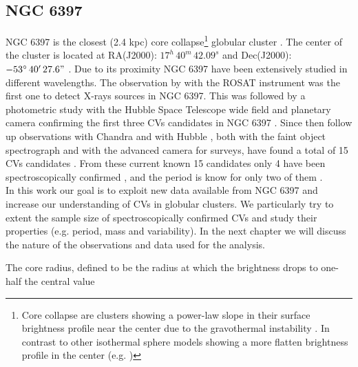 \subsection{NGC 6397}
NGC 6397 is the closest (2.4 kpc) core collapse\footnote{Core collapse are clusters showing a power-law slope in their surface brightness profile near the center due to the gravothermal instability \citep{antonov_solution_1962,lynden-bell_gravo-thermal_1968,lynden-bell_consequences_1980}. In contrast to other isothermal sphere models showing a more flatten brightness profile in the center (e.g. \cite{king_structure_1966})} globular cluster \citep{harris_catalog_1996,mclaughlin_resolved_2005}.  The center of the cluster is located at RA(J2000): $17^h \, 40^m \, 42.09^s$  and Dec(J2000): $-53^\circ \, 40'\, 27.6"$ \citep{harris_catalog_1996}. Due to its proximity NGC 6397 have been extensively studied in different  wavelengths. The observation by \cite{cool_discovery_1993} with the ROSAT instrument was the first one to detect X-rays sources in NGC 6397. This was followed by a photometric study with the Hubble Space Telescope wide field and planetary camera confirming the first three CVs candidates in NGC 6397 \citep{cool_discovery_1995}. Since then follow up observations with Chandra \citep{grindlay_chandra_2001,bogdanov_chandra_2010} and with Hubble \citep{taylor_helium_2001,grindlay_compact_2006}, both with the faint object spectrograph and with the advanced camera for surveys, have found a total of 15 CVs candidates \citep{cohn_identification_2010}. From these current known 15 candidates only 4 have been spectroscopically confirmed \citep{grindlay_spectroscopic_1995,edmonds_cataclysmic_1999}, and the period is know for only two of them \citep{kaluzny_time_2003,kaluzny_photometric_2006}. \\

In this work our goal is to exploit new data available from NGC 6397 and increase our understanding of CVs in globular clusters. We particularly try to extent the sample size of spectroscopically confirmed CVs and study their properties (e.g. period, mass and variability). In the next chapter we will discuss the nature of the observations and data used for the analysis.



The core radius, defined to be the radius
at which the brightness drops to one-half the central
value




